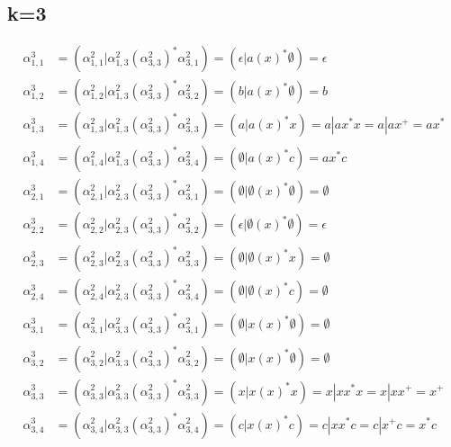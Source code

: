 \documentclass{article}
\begin{document}
\subsection*{k=3}
\begin{align*}
\alpha^3_{1,1} &= \left(\alpha^2_{1,1}|\alpha^2_{1,3}\left(\alpha^2_{3,3}\right)^*\alpha^2_{3,1}\right) = \left(\epsilon|a\left(x\right)^*\emptyset\right) = \epsilon \\
\alpha^3_{1,2} &= \left(\alpha^2_{1,2}|\alpha^2_{1,3}\left(\alpha^2_{3,3}\right)^*\alpha^2_{3,2}\right) = \left(b|a\left(x\right)^*\emptyset\right) = b \\
\alpha^3_{1,3} &= \left(\alpha^2_{1,3}|\alpha^2_{1,3}\left(\alpha^2_{3,3}\right)^*\alpha^2_{3,3}\right) = \left(a|a\left(x\right)^*x\right) = a|ax^*x = a|ax^+ = ax^*\\
\alpha^3_{1,4} &= \left(\alpha^2_{1,4}|\alpha^2_{1,3}\left(\alpha^2_{3,3}\right)^*\alpha^2_{3,4}\right) = \left(\emptyset|a\left(x\right)^*c\right) = ax^*c\\
\alpha^3_{2,1} &= \left(\alpha^2_{2,1}|\alpha^2_{2,3}\left(\alpha^2_{3,3}\right)^*\alpha^2_{3,1}\right) = \left(\emptyset|\emptyset\left(x\right)^*\emptyset\right) = \emptyset \\
\alpha^3_{2,2} &= \left(\alpha^2_{2,2}|\alpha^2_{2,3}\left(\alpha^2_{3,3}\right)^*\alpha^2_{3,2}\right) = \left(\epsilon|\emptyset\left(x\right)^*\emptyset\right) = \epsilon \\
\alpha^3_{2,3} &= \left(\alpha^2_{2,3}|\alpha^2_{2,3}\left(\alpha^2_{3,3}\right)^*\alpha^2_{3,3}\right) = \left(\emptyset|\emptyset\left(x\right)^*x\right) = \emptyset \\
\alpha^3_{2,4} &= \left(\alpha^2_{2,4}|\alpha^2_{2,3}\left(\alpha^2_{3,3}\right)^*\alpha^2_{3,4}\right) = \left(\emptyset|\emptyset\left(x\right)^*c\right) = \emptyset \\
\alpha^3_{3,1} &= \left(\alpha^2_{3,1}|\alpha^2_{3,3}\left(\alpha^2_{3,3}\right)^*\alpha^2_{3,1}\right) = \left(\emptyset|x\left(x\right)^*\emptyset\right) = \emptyset \\
\alpha^3_{3,2} &= \left(\alpha^2_{3,2}|\alpha^2_{3,3}\left(\alpha^2_{3,3}\right)^*\alpha^2_{3,2}\right) = \left(\emptyset|x\left(x\right)^*\emptyset\right) = \emptyset \\
\alpha^3_{3,3} &= \left(\alpha^2_{3,3}|\alpha^2_{3,3}\left(\alpha^2_{3,3}\right)^*\alpha^2_{3,3}\right) = \left(x|x\left(x\right)^*x\right) = x|xx^*x = x|xx^+ = x^+ \\
\alpha^3_{3,4} &= \left(\alpha^2_{3,4}|\alpha^2_{3,3}\left(\alpha^2_{3,3}\right)^*\alpha^2_{3,4}\right) = \left(c|x\left(x\right)^*c\right) = c|xx^*c = c|x^+c = x^*c \\

\end{align*}
\end{document}
